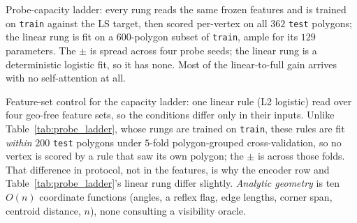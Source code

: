\documentclass[11pt]{article}
\begin{document}
\begin{table}[!ht]
  \centering
  \footnotesize
  
  \caption{Probe-capacity ladder: every rung reads the same frozen features and is trained on \texttt{train} against the LS target, then scored per-vertex on all $362$ \texttt{test} polygons; the linear rung is fit on a $600$-polygon subset of \texttt{train}, ample for its $129$ parameters. The $\pm$ is spread across four probe seeds; the linear rung is a deterministic logistic fit, so it has none. Most of the linear-to-full gain arrives with no self-attention at all.}
  \label{tab:probe_ladder}
  \vspace{1.2\baselineskip}
  \footnotesize
  
  \caption{Feature-set control for the capacity ladder: one linear rule (L2 logistic) read over four geo-free feature sets, so the conditions differ only in their inputs. Unlike Table~\ref{tab:probe_ladder}, whose rungs are trained on \texttt{train}, these rules are fit \emph{within} $200$ \texttt{test} polygons under $5$-fold polygon-grouped cross-validation, so no vertex is scored by a rule that saw its own polygon; the $\pm$ is across those folds. That difference in protocol, not in the features, is why the encoder row and Table~\ref{tab:probe_ladder}'s linear rung differ slightly. \emph{Analytic geometry} is ten $O(n)$ coordinate functions (angles, a reflex flag, edge lengths, corner span, centroid distance, $n$), none consulting a visibility oracle.}
  \label{tab:feature_baseline}
\end{table}
\end{document}
